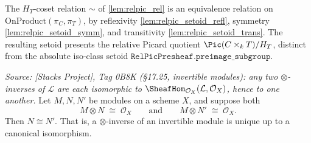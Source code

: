 \begin{definition}
  \label{lem:relpic_setoid}
  The \(H_T\)-coset relation \(\sim\) of \cref{lem:relpic_rel} is an equivalence
  relation on \(\mathrm{OnProduct}(\pi_C, \pi_T)\), by reflexivity
  \cref{lem:relpic_setoid_refl}, symmetry \cref{lem:relpic_setoid_symm}, and
  transitivity \cref{lem:relpic_setoid_trans}. The resulting setoid presents the
  relative Picard quotient \(\Pic(C \times_k T) / H_T\), distinct from the
  absolute iso-class setoid \(\mathtt{RelPicPresheaf.preimage\_subgroup}\).
\end{definition}

\begin{lemma}
  \label{lem:tensor_inverse_unique}
  \textit{Source: [Stacks Project], Tag 0B8K (\S 17.25, invertible modules): any
  two \(\otimes\)-inverses of \(\mathcal{L}\) are each isomorphic to
  \(\SheafHom_{\mathcal{O}_X}(\mathcal{L}, \mathcal{O}_X)\), hence to one
  another.}
  Let \(M, N, N'\) be modules on a scheme \(X\), and suppose both
  \[
    M \otimes N \;\cong\; \mathcal{O}_X
    \qquad\text{and}\qquad
    M \otimes N' \;\cong\; \mathcal{O}_X .
  \]
  Then \(N \cong N'\). That is, a \(\otimes\)-inverse of an invertible module is
  unique up to a canonical isomorphism.
\end{lemma}

